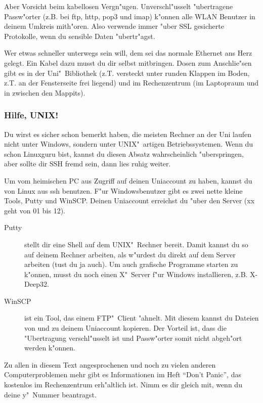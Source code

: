 Aber Vorsicht beim kabellosen Vergn"ugen. Unverschl"usselt "ubertragene
Passw"orter (z.B. bei ftp, http, pop3 und imap) k"onnen alle WLAN
Benutzer in deinem Umkreis mith"oren. Also verwende immer "uber SSL
gesicherte Protokolle, wenn du sensible Daten "ubertr"agst.

Wer etwas schneller unterwegs sein will, dem sei das normale Ethernet ans
Herz gelegt. Ein Kabel dazu musst du dir selbst mitbringen. Dosen zum
Anschlie"sen gibt es in der Uni"~Bibliothek (z.T. versteckt unter runden
Klappen im Boden, z.T. an der Fensterseite frei liegend) und im
Rechenzentrum (im Laptopraum  und in  zwischen den
Mappits).

\subsubsection{Hilfe, UNIX!}
Du wirst es sicher schon bemerkt haben, die meisten Rechner an der Uni
laufen nicht unter Windows, sondern unter UNIX"~artigen Betriebssystemen.
Wenn du schon Linuxguru bist, kannst du diesen Absatz wahrscheinlich
"uberspringen, aber sollte dir SSH fremd sein, dann lies ruhig
weiter.\par
Um vom heimischen PC aus Zugriff auf deinen Uniaccount zu haben, kannst
du von Linux aus ssh benutzen. F"ur Windowsbenutzer gibt es zwei nette
kleine Tools, Putty und WinSCP. Deinen Uniaccount erreichst du "uber
den Server  (xx geht von 01 bis 12).

\begin{description}
\item[Putty] stellt dir eine Shell auf dem UNIX"~Rechner bereit. Damit
kannst du so auf deinem Rechner arbeiten, als w"urdest du direkt auf
dem Server arbeiten (tust du ja auch). Um auch grafische Programme
starten zu k"onnen, musst du noch einen X"~Server f"ur Windows installieren,
z.B. X-Deep32.
\item[WinSCP] ist ein Tool, das einem FTP"~Client "ahnelt. Mit diesem
kannst du Dateien von und zu deinem Uniaccount kopieren. Der Vorteil
ist, dass die "Ubertragung verschl"usselt ist und Passw"orter somit
nicht abgeh"ort werden k"onnen.
\end{description}

Zu allen in diesem Text angesprochenen und noch zu vielen anderen
Computerproblemen mehr gibt es Informationen im Heft "`Don't Panic"',
das kostenlos im Rechenzentrum erh"altlich ist. Nimm es dir gleich mit, wenn
du deine y"~Nummer beantragst.

